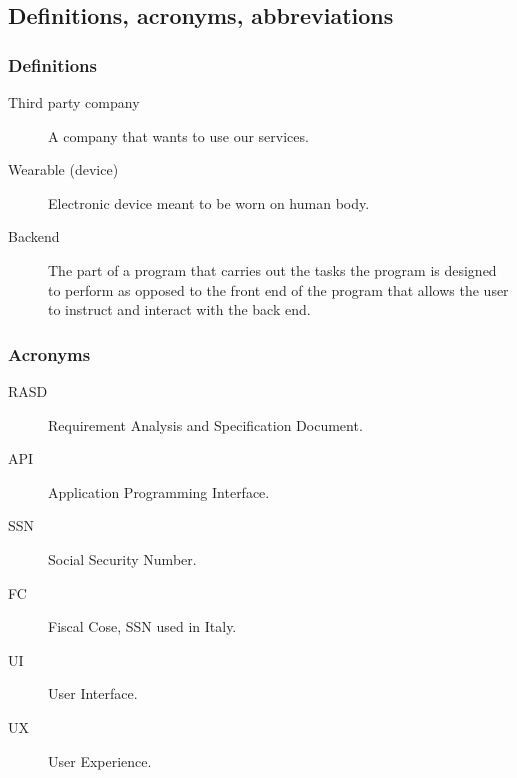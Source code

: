 \documentclass[../main.tex]{subfiles}
\begin{document}
%
%
%
%
%

\subsection{Definitions, acronyms, abbreviations}

\subsubsection{Definitions}
\begin{description}

	\item [Third party company] A company that wants to use our services.
	\item [Wearable (device)] Electronic device meant to be worn on human body.
	\item [Backend] The part of a program that carries out the tasks the program is designed to perform as opposed to the front end of the program that allows the user to instruct and interact with the back end.

\end{description}


\subsubsection{Acronyms}
\begin{description}

	\item [RASD] Requirement Analysis and Specification Document.
	\item [API] Application Programming Interface.
	\item [SSN] Social Security Number.
	\item [FC] Fiscal Cose, SSN used in Italy.
	\item [UI] User Interface.
	\item [UX] User Experience.

\end{description}
\end{document}
